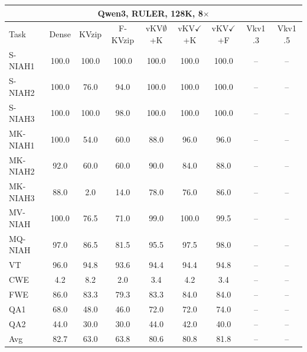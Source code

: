 \begin{tabular}{lcccccccc}
\toprule
\multicolumn{9}{c}{Qwen3, RULER, 128K, 8$\times$} \\
\midrule
Task & Dense & KVzip & F-KVzip & vKV$\emptyset$+K & vKV$\checkmark$+K & vKV$\checkmark$+F & Vkv1 .3 & Vkv1 .5 \\
\midrule
S-NIAH1 & 100.0 & 100.0 & 100.0 & 100.0 & 100.0 & 100.0 & -- & -- \\
S-NIAH2 & 100.0 & 76.0 & 94.0 & 100.0 & 100.0 & 100.0 & -- & -- \\
S-NIAH3 & 100.0 & 100.0 & 98.0 & 100.0 & 100.0 & 100.0 & -- & -- \\
MK-NIAH1 & 100.0 & 54.0 & 60.0 & 88.0 & 96.0 & 96.0 & -- & -- \\
MK-NIAH2 & 92.0 & 60.0 & 60.0 & 90.0 & 84.0 & 88.0 & -- & -- \\
MK-NIAH3 & 88.0 & 2.0 & 14.0 & 78.0 & 76.0 & 86.0 & -- & -- \\
MV-NIAH & 100.0 & 76.5 & 71.0 & 99.0 & 100.0 & 99.5 & -- & -- \\
MQ-NIAH & 97.0 & 86.5 & 81.5 & 95.5 & 97.5 & 98.0 & -- & -- \\
VT & 96.0 & 94.8 & 93.6 & 94.4 & 94.4 & 94.8 & -- & -- \\
CWE & 4.2 & 8.2 & 2.0 & 3.4 & 4.2 & 3.4 & -- & -- \\
FWE & 86.0 & 83.3 & 79.3 & 83.3 & 84.0 & 84.0 & -- & -- \\
QA1 & 68.0 & 48.0 & 46.0 & 72.0 & 72.0 & 74.0 & -- & -- \\
QA2 & 44.0 & 30.0 & 30.0 & 44.0 & 42.0 & 40.0 & -- & -- \\
\midrule
Avg & 82.7 & 63.0 & 63.8 & 80.6 & 80.8 & 81.8 & -- & -- \\
\bottomrule
\end{tabular}
\vspace{0.8em}

